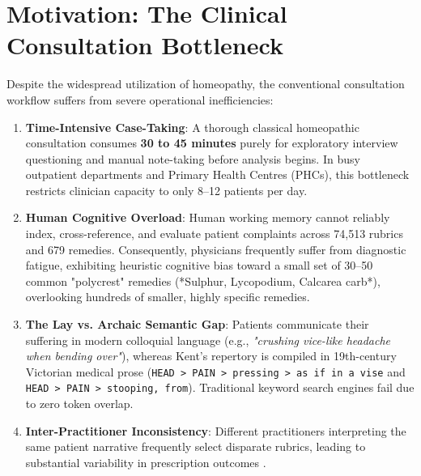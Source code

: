 \begin{sloppypar}
\section{Motivation: The Clinical Consultation Bottleneck}
Despite the widespread utilization of homeopathy, the conventional consultation workflow suffers from severe operational inefficiencies:
\begin{enumerate}
    \item \textbf{Time-Intensive Case-Taking}: A thorough classical homeopathic consultation consumes \textbf{30 to 45 minutes} purely for exploratory interview questioning and manual note-taking before analysis begins. In busy outpatient departments and Primary Health Centres (PHCs), this bottleneck restricts clinician capacity to only 8--12 patients per day.
    \item \textbf{Human Cognitive Overload}: Human working memory cannot reliably index, cross-reference, and evaluate patient complaints across 74,513 rubrics and 679 remedies. Consequently, physicians frequently suffer from diagnostic fatigue, exhibiting heuristic cognitive bias toward a small set of 30--50 common "polycrest" remedies (*Sulphur, Lycopodium, Calcarea carb*), overlooking hundreds of smaller, highly specific remedies.
    \item \textbf{The Lay vs. Archaic Semantic Gap}: Patients communicate their suffering in modern colloquial language (e.g., \emph{"crushing vice-like headache when bending over"}), whereas Kent's repertory is compiled in 19th-century Victorian medical prose (\texttt{HEAD > PAIN > pressing > as if in a vise} and \texttt{HEAD > PAIN > stooping, from}). Traditional keyword search engines fail due to zero token overlap.
    \item \textbf{Inter-Practitioner Inconsistency}: Different practitioners interpreting the same patient narrative frequently select disparate rubrics, leading to substantial variability in prescription outcomes \cite{Doherty2026_HOHM}.
\end{enumerate}


\end{sloppypar}
